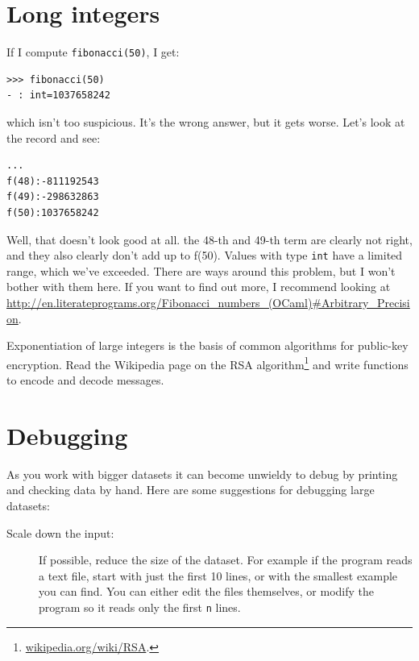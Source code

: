 \documentclass[10pt]{book}
\begin{document}
{\section{Long integers}


If I compute {\tt fibonacci(50)}, I get:

\beforeverb
\begin{verbatim}
>>> fibonacci(50)
- : int=1037658242
\end{verbatim}
\afterverb
%
which isn't too suspicious. It's the wrong answer, but it gets worse. Let's look at the record 
and see:

\beforeverb
\begin{verbatim}
...
f(48):-811192543
f(49):-298632863
f(50):1037658242
\end{verbatim}
\afterverb
Well, that doesn't look good at all. the 48-th and 49-th term are clearly not right, and they also clearly don't add up to f(50). Values with type {\tt int} have a limited range, which we've exceeded. There are ways around this problem, but I won't bother with them here. If you want to find out more, I recommend looking at \url{http://en.literateprograms.org/Fibonacci_numbers_(OCaml)#Arbitrary_Precision}.

\begin{ex}


Exponentiation of large integers is the basis of common
algorithms for public-key encryption.  Read the Wikipedia
page on the RSA algorithm\footnote{\url{wikipedia.org/wiki/RSA}.}
and write functions to encode and decode messages.

\end{ex}


\section{Debugging}
As you work with bigger datasets it can become unwieldy to
debug by printing and checking data by hand.  Here are some
suggestions for debugging large datasets:

\begin{description}

\item[Scale down the input:] If possible, reduce the size of the
dataset.  For example if the program reads a text file, start with
just the first 10 lines, or with the smallest example you can find.
You can either edit the files themselves, or modify the
program so it reads only the first {\tt n} lines.


\end{description}}
\end{document}
